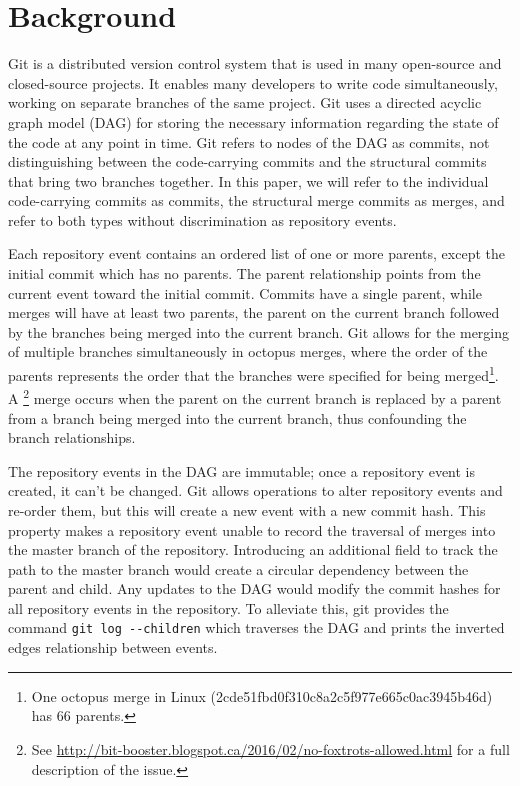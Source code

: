 
\section{Background}
\label{sec:background}

Git is a distributed version control system that is used in many
open-source and closed-source projects. It enables many developers to
write code simultaneously, working on separate branches of the same
project. Git uses a directed acyclic graph model (DAG) for storing the
necessary information regarding the state of the code at any point in
time. Git refers to nodes of the DAG as commits, not distinguishing
between the code-carrying commits and the structural commits that bring
two branches together. In this paper, we will refer to the individual
code-carrying commits as commits, the structural merge commits as
merges, and refer to both types without discrimination as repository
events.

Each repository event contains an ordered list of one or more parents,
except the initial commit which has no parents. The parent relationship
points from the current event toward the initial commit.  Commits have a
single parent, while merges will have at least two parents, the parent
on the current branch followed by the branches being merged into the
current branch. Git allows for the merging of multiple branches
simultaneously in octopus merges, where the order of the parents
represents the order that the branches were specified for being merged\footnote{One octopus merge in Linux
  (2cde51fbd0f310c8a2c5f977e665c0ac3945b46d) has 66 parents.}.
A \foxtrot\footnote{See
  \url{http://bit-booster.blogspot.ca/2016/02/no-foxtrots-allowed.html}
  for a full description of the issue.} merge occurs when the parent on
the current branch is replaced by a parent from a branch being merged
into the current branch, thus confounding the branch relationships.


The repository events in the DAG are immutable; once a repository event
is created, it can't be changed. Git allows operations to alter
repository events and re-order them, but this will create a new event
with a new commit hash. This property makes a repository event unable to
record the traversal of merges into the master branch of the repository.
Introducing an additional field to track the path to the master branch
would create a circular dependency between the parent and child. Any
updates to the DAG would modify the commit hashes for all repository
events in the repository. To alleviate this, git provides the command
\verb|git log --children| which traverses the DAG and prints the
inverted edges relationship between events.

